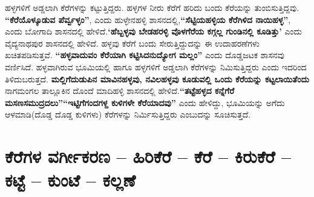 ಹಳ್ಳಗಳಿಗೆ ಅಡ್ಡಲಾಗಿ ಕೆರೆಗಳನ್ನು ಕಟ್ಟುತ್ತಿದ್ದರು. ಹಳ್ಳಗಳ ನೀರು ಕೆರೆಗೆ ಹರಿದು ಬಂದು ಕೆರೆಯನ್ನು ತುಂಬಿಸುತ್ತಿದ್ದವು. \textbf{“ಕೆರೆಯೊಳ್ಕೂಡುವ ಪೆರ್ವ್ವಳ್ಳಂ”}, ಎಂದು ಹುಳ್ಳೇನಹಳ್ಳಿ ಶಾಸನದಲ್ಲಿ,\textbf{“ಸೆಟ್ಟಿಯಹಳ್ಳಿಯ ಕೆರೆಗಿಳಿದ ನಾಯಿಹಳ್ಳ”}, ಎಂದು ಬೋಗಾದಿ ಶಾಸನದಲ್ಲಿ ಹೇಳಿದೆ.\textbf{‘ಹೆಬ್ಬಳ್ಳವು ಬೇಡಹರಳ್ಳಿ ವೊಳಗೆರೆಯ ಕಗ್ಗಲ್ಲ ಗುಂಡಿನಲ್ಲಿ ಕೂಡಿತ್ತು’} ಎಂದು ವೈದ್ಯನಾಥಪುರ ಶಾಸನದಲ್ಲಿ ಹೇಳಿದೆ. ಹಳ್ಳವು ಕೆರೆಗೆ ಬಂದು ಸೇರುತ್ತಿದ್ದುದನ್ನು ಈ ಉದಾಹರಣೆಗಳು ಖಚಿತಪಡಿಸುತ್ತವೆ. \textbf{“ಹಳ್ಳವಾದುವಂ ಕೆರೆಯಾಗಿ ಕಟ್ಟಿಸಿದನುದ್ಯೋಗ ಮಲ್ಲಂ”} ಎಂದು ದೊಡ್ಡಜಟಕ ಶಾಸನವು ವರ್ಣಿಸಿದೆ. ಹಳ್ಳವಾಗಿರುವ ಭೂಮಿಯಲ್ಲಿ ಹಾಗೂ ಹಳ್ಳಗಳಿಗೆ ಅಡ್ಡಲಾಗಿ ಕೆರೆಗಳನ್ನು ನಿಮಿಸುತ್ತಿದ್ದರು ಎಂದು ಇದರಿಂದ ತಿಳಿದುಬರುತ್ತದೆ. \textbf{ಮಲ್ಲಿಗೆದುಡುಪಿನ ಮಾವಿನಹಳ್ಳವು, ನವಿಲಹಳ್ಳವು ಕೂಡುವಲ್ಲಿ ಒಂದು ಕೆರೆಯನ್ನು ಕಟ್ಟಲಾಯಿತೆಂದು} ನಾಗಮಂಗಲ ತಾಲ್ಲೂಕಿನ ದೊಂದೆ ಮಾದಿಹಳ್ಳಿ ಶಾಸನದಲ್ಲಿ ಹೇಳಿದೆ.\textbf{“ತಟ್ಟೆಹಳ್ಳದ ಕನ್ನೆಗೆರೆ ಮಸಣಸಮುದ್ರದಲು”}\textbf{“ಇಟ್ಟಿಗೆಗಂದಗಳ್ದ ಕುಳಿಗಳೇ ಕೆರೆಯಾದವು”} ಎಂದು ಹೇಳಿದ್ದು, ಭೂಮಿಯನ್ನು ಅಗೆದು ಆಳಮಾಡಿ(ದೊಡ್ಡ ದೊಡ್ಡ ಕುಳಿಗಳು) ಕೆರೆಗಳನ್ನು ನಿರ್ಮಿಸುತ್ತಿದ್ದರು ಎಂಬುದನ್ನು ಸೂಚಿಸುತ್ತದೆ.

\section*{ಕೆರೆಗಳ ವರ್ಗೀಕರಣ – ಹಿರಿಕೆರೆ – ಕೆರೆ – ಕಿರುಕೆರೆ – ಕಟ್ಟೆ – ಕುಂಟೆ – ಕಲ್ಲಣೆ}

